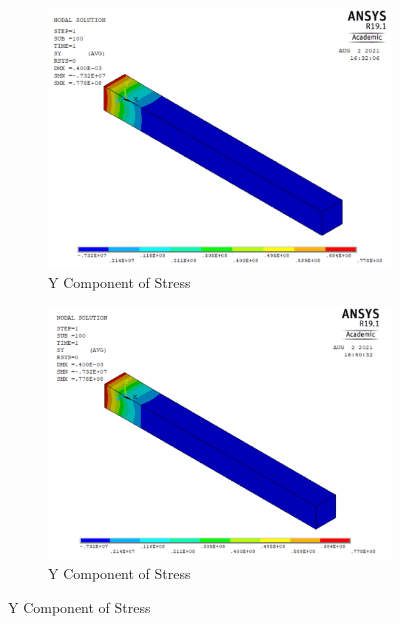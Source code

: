 \documentclass[a4paper,12pt]{extarticle}
\begin{document}
\begin{figure}[htbp]\ContinuedFloat     
     \begin{subfigure}[b]{0.4\textwidth}
         \centering
         \includegraphics[width=1.1\textwidth]{16.Ansys_SY.png}
         \caption{Y Component of Stress}
         \label{fig:Y Component of Stress}
     \end{subfigure}
     \hfill
      \begin{subfigure}[b]{0.4\textwidth}
         \centering
         \includegraphics[width=1.1\textwidth]{19.User_SY.png}
         \caption{Y Component of Stress}
         \label{fig:Y Component of Stress2}
     \end{subfigure}
\end{figure}
\end{document}

